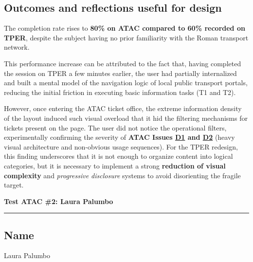 ﻿\documentclass[11pt,a4paper]{article}
\begin{document}
\subsection*{Outcomes and reflections useful for design}
\begin{tcolorbox}[base]
The completion rate rises to \textbf{80\% on ATAC compared to 60\% recorded on TPER}, despite the subject having no prior familiarity with the Roman transport network.

This performance increase can be attributed to the fact that, having completed the session on TPER a few minutes earlier, the user had partially internalized and built a mental model of the navigation logic of local public transport portals, reducing the initial friction in executing basic information tasks (T1 and T2).

However, once entering the ATAC ticket office, the extreme information density of the layout induced such visual overload that it hid the filtering mechanisms for tickets present on the page. The user did not notice the operational filters, experimentally confirming the severity of \textbf{ATAC Issues \hyperref[atac:D1]{D1} and \hyperref[atac:D2]{D2}} (heavy visual architecture and non-obvious usage sequences). For the TPER redesign, this finding underscores that it is not enough to organize content into logical categories, but it is necessary to implement a strong \textbf{reduction of visual complexity} and \textit{progressive disclosure} systems to avoid disorienting the fragile target.
\end{tcolorbox}


\newpage
\begin{center}
  {\color{secondaryColor}\large\bfseries
  Test ATAC \#2: Laura Palumbo}\\
  \vspace{0.1cm}
  \color{borderColor}\hrule
\end{center}

\vspace{0.5cm}

\subsection*{Name}
\begin{tcolorbox}[base]
Laura Palumbo
\end{tcolorbox}
\end{document}
